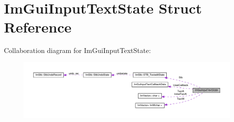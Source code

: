 \hypertarget{structImGuiInputTextState}{}\section{Im\+Gui\+Input\+Text\+State Struct Reference}
\label{structImGuiInputTextState}


Collaboration diagram for Im\+Gui\+Input\+Text\+State\+:\nopagebreak
\begin{figure}[H]
\begin{center}
\leavevmode
\includegraphics[width=350pt]{structImGuiInputTextState__coll__graph}
\end{center}
\end{figure}
